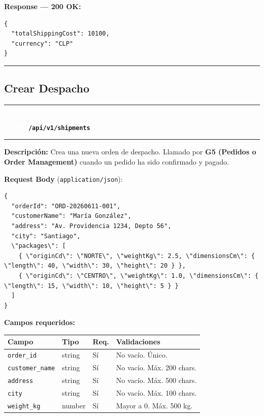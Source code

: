 \documentclass[11pt, a4paper]{article}
\newcommand{\httpmethod}[2]{%
  \colorbox{#1}{\textcolor{white}{\textbf{\small\textsf{#2}}}}%
}
\newcommand{\routeheader}[3]{%
  \noindent\rule{\textwidth}{1.5pt}\\[0.3em]
  \httpmethod{#1}{#2}\;\texttt{\bfseries #3}\\[0.3em]
  \rule{\textwidth}{0.4pt}
  \vspace{0.3cm}
}
\begin{document}
\textbf{Response --- 200 OK:}

\begin{lstlisting}
{
  "totalShippingCost": 10100,
  "currency": "CLP"
}
\end{lstlisting}

\noindent\rule{\textwidth}{0.4pt}

\subsection{Crear Despacho}

\routeheader{post}{POST}{/api/v1/shipments}

\textbf{Descripción:} Crea una nueva orden de despacho. Llamado por
\textbf{G5 (Pedidos o Order Management)} cuando un pedido ha sido confirmado y pagado.

\vspace{0.3cm}
\textbf{Request Body} (\texttt{application/json}):

\begin{lstlisting}
{
  "orderId": "ORD-20260611-001",
  "customerName": "María González",
  "address": "Av. Providencia 1234, Depto 56",
  "city": "Santiago",
  \"packages\": [
    { \"originCd\": \"NORTE\", \"weightKg\": 2.5, \"dimensionsCm\": { \"length\": 40, \"width\": 30, \"height\": 20 } },
    { \"originCd\": \"CENTRO\", \"weightKg\": 1.0, \"dimensionsCm\": { \"length\": 15, \"width\": 10, \"height\": 5 } }
  ]
}
\end{lstlisting}

\textbf{Campos requeridos:}
\begin{table}[h!]
\small
\begin{tabularx}{\textwidth}{l l l X}
  \toprule
  \textbf{Campo} & \textbf{Tipo} & \textbf{Req.} & \textbf{Validaciones} \\
  \midrule
  \texttt{order\_id}      & string & Sí & No vacío. Único. \\
  \texttt{customer\_name} & string & Sí & No vacío. Máx. 200 chars. \\
  \texttt{address}        & string & Sí & No vacío. Máx. 500 chars. \\
  \texttt{city}           & string & Sí & No vacío. Máx. 100 chars. \\
  \texttt{weight\_kg}     & number & Sí & Mayor a 0. Máx. 500 kg. \\
  \bottomrule
\end{tabularx}
\end{table}
\end{document}
